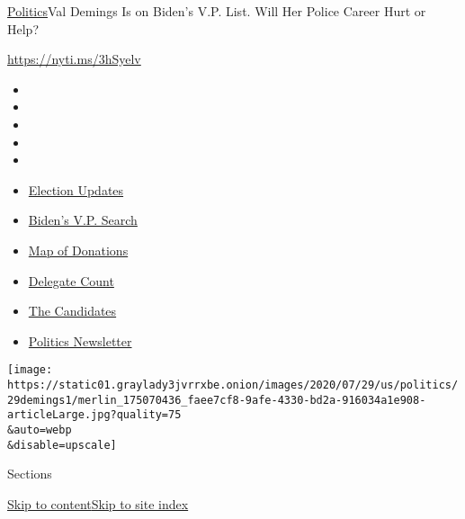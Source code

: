 \href{/section/politics}{Politics}\textbar{}Val Demings Is on Biden's
V.P. List. Will Her Police Career Hurt or Help?

\href{https://nyti.ms/3hSyelv}{https://nyti.ms/3hSyelv}

\begin{itemize}
\item
\item
\item
\item
\item
\end{itemize}

\begin{itemize}
\item
  \href{https://www.nytimes3xbfgragh.onion/2020/08/03/us/elections/biden-vs-trump.html?action=click\&pgtype=Article\&state=default\&region=TOP_BANNER\&context=storylines_menu}{Election
  Updates}
\item
  \href{https://www.nytimes3xbfgragh.onion/article/biden-vice-president-2020.html?action=click\&pgtype=Article\&state=default\&region=TOP_BANNER\&context=storylines_menu}{Biden's
  V.P. Search}
\item
  \href{https://www.nytimes3xbfgragh.onion/interactive/2020/07/24/us/politics/trump-biden-campaign-donors.html?action=click\&pgtype=Article\&state=default\&region=TOP_BANNER\&context=storylines_menu}{Map
  of Donations}
\item
  \href{https://www.nytimes3xbfgragh.onion/interactive/2020/us/elections/delegate-count-primary-results.html?action=click\&pgtype=Article\&state=default\&region=TOP_BANNER\&context=storylines_menu}{Delegate
  Count}
\item
  \href{https://www.nytimes3xbfgragh.onion/interactive/2019/us/politics/2020-presidential-candidates.html?action=click\&pgtype=Article\&state=default\&region=TOP_BANNER\&context=storylines_menu}{The
  Candidates}
\item
  \href{https://www.nytimes3xbfgragh.onion/newsletters/politics?action=click\&pgtype=Article\&state=default\&region=TOP_BANNER\&context=storylines_menu}{Politics
  Newsletter}
\end{itemize}

\texttt{[image: https://static01.graylady3jvrrxbe.onion/images/2020/07/29/us/politics/29demings1/merlin\_175070436\_faee7cf8-9afe-4330-bd2a-916034a1e908-articleLarge.jpg?quality=75\\\&auto=webp\\\&disable=upscale]}

Sections

\protect\hyperlink{site-content}{Skip to
content}\protect\hyperlink{site-index}{Skip to site index}

